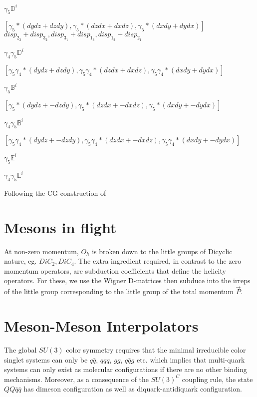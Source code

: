 $\gamma_5\mathbb{D}^i$

$[\gamma_5 * (dydz + dzdy), \gamma_5 * (dzdx + dxdz), \gamma_5 * (dxdy + dydx)]$
$disp_{2_3}+ disp_{3_2}, disp_{3_1} + disp_{1_3}, disp_{1_2} + disp_{2_1}$

$\gamma_4\gamma_5\mathbb{D}^i$

$[\gamma_5\gamma_4 * (dydz + dzdy), \gamma_5\gamma_4 * (dzdx + dxdz), \gamma_5\gamma_4 * (dxdy + dydx)]$

$\gamma_5\mathbb{B}^i$

$[\gamma_5 * (dydz + -dzdy), \gamma_5 * (dzdx + -dxdz), \gamma_5 * (dxdy + -dydx)]$

$\gamma_4\gamma_5\mathbb{B}^i$

$[\gamma_5\gamma_4 * (dydz + -dzdy), \gamma_5\gamma_4 * (dzdx + -dxdz), \gamma_5\gamma_4 * (dxdy + -dydx)]$

$\gamma_5\mathbb{E}^i$

$\gamma_4\gamma_5\mathbb{E}^i$



Following the CG construction of \cite{Basak_2005}

\section{Mesons in flight}

At non-zero momentum, $O_h$ is broken down to the little groups of Dicyclic nature, eg. $DiC_2, DiC_4$. The extra ingredient required, in contrast to the zero momentum operators, are subduction coefficients that define the helicity operators. For these, we use the Wigner D-matrices then subduce into the irreps of the little group corresponding to the little group of the total momentum $\vec{P}$. 

\section{Meson-Meson Interpolators}
The global $SU(3)$ color symmetry requires that the minimal irreducible color singlet systems can only be $q\bar{q}$, $qqq$, $gg$, $q\bar{q}g$ etc. which implies that multi-quark systems can only exist as molecular configurations if there are no other binding mechanisms. Moreover, as a consequence of the $SU(3)^C$ coupling rule, the state $QQ\bar{q}\bar{q}$ has dimeson configuration as well as diquark-antidiquark configuration. 

